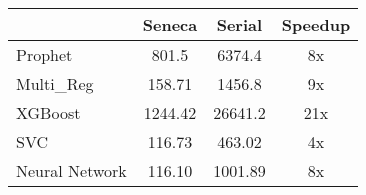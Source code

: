 \begin{tabular}{|l|c|c|c|}
\hline
& Seneca & Serial & Speedup \\
\hline
Prophet & 801.5 & 6374.4 & 8x\\
\hline
Multi\_Reg & 158.71 & 1456.8 & 9x \\
\hline
XGBoost & 1244.42 & 26641.2 & 21x\\
\hline
SVC & 116.73 & 463.02 & 4x\\
\hline
Neural Network & 116.10 & 1001.89 & 8x\\
\hline
\end{tabular}
